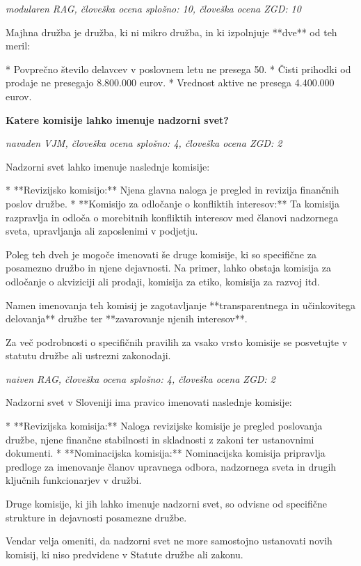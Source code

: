 \documentclass[a4paper,12pt,openright]{book}
\begin{document}
\vspace{0.5cm}
\textit{modularen RAG, človeška ocena splošno: 10, človeška ocena ZGD: 10}

Majhna družba je družba, ki ni mikro družba, in ki izpolnjuje **dve** od teh meril:

* Povprečno število delavcev v poslovnem letu ne presega 50.
* Čisti prihodki od prodaje ne presegajo 8.800.000 eurov.
* Vrednost aktive ne presega 4.400.000 eurov.

\vspace{0.5cm}
\textbf{Katere komisije lahko imenuje nadzorni svet?}

\textit{navaden VJM, človeška ocena splošno: 4, človeška ocena ZGD: 2}

Nadzorni svet lahko imenuje naslednje komisije:

* **Revizijsko komisijo:**  Njena glavna naloga je pregled in revizija finančnih poslov družbe.
* **Komisijo za odločanje o konfliktih interesov:** Ta komisija razpravlja in odloča o morebitnih konfliktih interesov med članovi nadzornega sveta, upravljanja ali zaposlenimi v podjetju.

Poleg teh dveh je mogoče imenovati še druge komisije, ki so specifične za posamezno družbo in njene dejavnosti. Na primer, lahko obstaja komisija za odločanje o  akviziciji ali prodaji, komisija za etiko, komisija za razvoj itd.

Namen imenovanja teh komisij je zagotavljanje **transparentnega in učinkovitega delovanja** družbe ter **zavarovanje njenih interesov**.


Za več podrobnosti o specifičnih pravilih za vsako vrsto komisije se posvetujte v statutu družbe ali ustrezni zakonodaji.

\vspace{0.5cm}
\textit{naiven RAG, človeška ocena splošno: 4, človeška ocena ZGD: 2}

Nadzorni svet v Sloveniji ima pravico imenovati naslednje komisije:

* **Revizijska komisija:** Naloga revizijske komisije je pregled poslovanja družbe, njene finančne stabilnosti in skladnosti z zakoni ter ustanovnimi dokumenti.
* **Nominacijska komisija:** Nominacijska komisija pripravlja predloge za imenovanje članov upravnega odbora, nadzornega sveta in drugih ključnih funkcionarjev v družbi.

Druge komisije, ki jih lahko imenuje nadzorni svet, so odvisne od specifične strukture in dejavnosti posamezne družbe.


Vendar velja omeniti, da nadzorni svet ne more samostojno ustanovati novih komisij, ki niso predvidene v Statute družbe ali zakonu.
\end{document}
